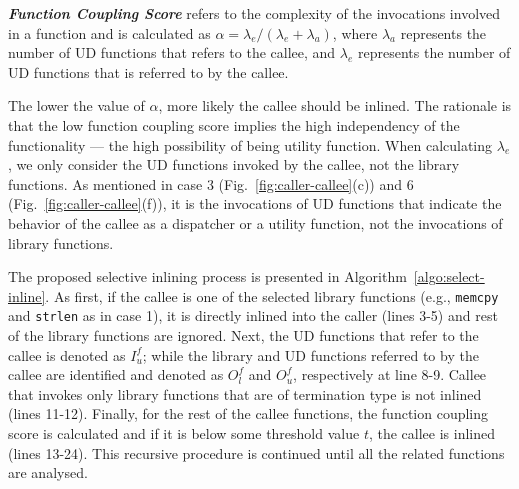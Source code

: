 \begin{mydef} \label{def:comp_semantic}
\emph{\textbf{Function Coupling Score}}
refers to the complexity of the invocations involved in a function and is calculated as $\alpha = \lambda_e/({\lambda_e + \lambda_a})$,
where $\lambda_a$ represents the number of UD functions that refers to the callee, and  $\lambda_e$ represents the number of UD functions that is referred to by the callee.
\end{mydef}
The lower the value of $\alpha$, more likely the callee should be inlined. The rationale is that the low function coupling score implies the high independency of the functionality ---  the high possibility of being utility function.
When calculating $\lambda_e$, we only consider the UD functions invoked by the callee, not the library functions. As mentioned in case 3 (Fig.~\ref{fig:caller-callee}(c)) and 6 (Fig.~\ref{fig:caller-callee}(f)), it is the invocations of UD functions that indicate the behavior of the callee as a dispatcher or a utility function, not the invocations of library functions.


The proposed selective inlining process is presented in Algorithm~\ref{algo:select-inline}. As first, if the callee is one of the selected library functions (e.g., \texttt{memcpy} and \texttt{strlen} as in case 1), it is directly inlined into the caller (lines 3-5) and rest of the library functions are ignored. Next, the UD functions that refer to the callee is denoted as $I_u^f$; while the library and UD functions  referred to by the callee are identified and denoted as $O_l^f$ and $O_u^f$, respectively at line 8-9. Callee that invokes only library functions that are of termination type is not inlined (lines 11-12). Finally, for the rest of the callee functions, the function coupling score is calculated and if it is  below some threshold value $t$, the callee is inlined (lines 13-24). This recursive procedure is continued until all the related functions are analysed.

